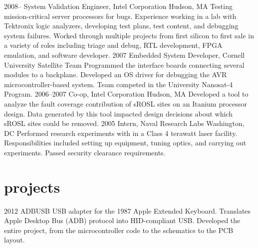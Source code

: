 \documentclass[]{friggeri-cv}
\begin{document}
\begin{entrylist}
  \entry
    {2008--}
    {System Validation Engineer, Intel Corporation}
    {Hudson, MA}
    {Testing mission-critical server processors for bugs. Experience working in a lab with Tektronix logic analyzers, developing test plans, test content, and debugging system failures. Worked through multiple projects from first silicon to first sale in a variety of roles including triage and debug, RTL development, FPGA emulation, and software developer.}
  \entry
    {2007}
    {Embedded System Developer, Cornell University Satellite Team}
    {}
    {Programmed the interface boards connecting several modules to a backplane. Developed an OS driver for debugging the AVR microcontroller-based system. Team competed in the University Nanosat-4 Program.}
  \entry
    {2006--2007}
    {Co-op, Intel Corporation}
    {Hudson, MA}
    {Developed a tool to analyze the fault coverage contribution of sROSL sites on an Itanium processor design. Data generated by this tool impacted design decisions about which sROSL sites could be removed.}
    \entry
    {2005}
    {Intern, Naval Research Labs}
    {Washington, DC}
    {Performed research experiments with in a Class 4 terawatt laser facility. Responsibilities included setting up equipment, tuning optics, and carrying out experiments. Passed security clearance requirements.}
\end{entrylist}

\section{projects}

\begin{entrylist}
  \entry
    {2012}
    {ADBUSB}
    {}
    {USB adapter for the 1987 Apple Extended Keyboard. Translates Apple Desktop Bus (ADB) protocol into HID-compliant USB. Developed the entire project, from the microcontroller code to the schematics to the PCB layout.}
\end{entrylist}
\end{document}

